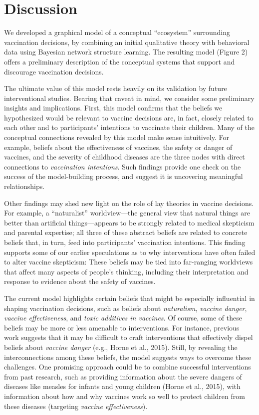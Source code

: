 \documentclass[10pt, letterpaper]{article}
\begin{document}
\section{Discussion}\label{discussion}

We developed a graphical model of a conceptual ``ecosystem'' surrounding
vaccination decisions, by combining an initial qualitative theory with
behavioral data using Bayesian network structure learning. The resulting
model (Figure 2) offers a preliminary description of the conceptual
systems that support and discourage vaccination decisions.

The ultimate value of this model rests heavily on its validation by
future interventional studies. Bearing that caveat in mind, we consider
some preliminary insights and implications. First, this model confirms
that the beliefs we hypothesized would be relevant to vaccine decisions
are, in fact, closely related to each other and to participants'
intentions to vaccinate their children. Many of the conceptual
connections revealed by this model make sense intuitively. For example,
beliefs about the effectiveness of vaccines, the safety or danger of
vaccines, and the severity of childhood diseases are the three nodes
with direct connections to \emph{vaccination intentions}. Such findings
provide one check on the success of the model-building process, and
suggest it is uncovering meaningful relationships.

Other findings may shed new light on the role of lay theories in vaccine
decisions. For example, a ``naturalist'' worldview---the general view
that natural things are better than artificial things---appears to be
strongly related to medical skepticism and parental expertise; all three
of these abstract beliefs are related to concrete beliefs that, in turn,
feed into participants' vaccination intentions. This finding supports
some of our earlier speculations as to why interventions have often
failed to alter vaccine skepticism: These beliefs may be tied into
far-ranging worldviews that affect many aspects of people's thinking,
including their interpretation and response to evidence about the safety
of vaccines.

The current model highlights certain beliefs that might be especially
influential in shaping vaccination decisions, such as beliefs about
\emph{naturalism}, \emph{vaccine danger}, \emph{vaccine effectiveness},
and \emph{toxic additives in vaccines}. Of course, some of these beliefs
may be more or less amenable to interventions. For instance, previous
work suggests that it may be difficult to craft interventions that
effectively dispel beliefs about \emph{vaccine danger} (e.g., Horne et
al., 2015). Still, by revealing the interconnections among these
beliefs, the model suggests ways to overcome these challenges. One
promising approach could be to combine successful interventions from
past research, such as providing information about the severe dangers of
diseases like measles for infants and young children (Horne et al.,
2015), with information about how and why vaccines work so well to
protect children from these diseases (targeting \emph{vaccine
effectiveness}).
\end{document}
